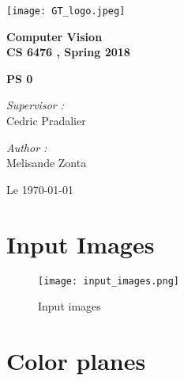 \documentclass[a4paper,11pt]{article}
\begin{document}

\begin{titlepage}

\begin{center}
\texttt{[image: GT\_logo.jpeg]}
\end{center}
\hrulefill
\begin{center}\bfseries\huge
   Computer Vision \\
   CS 6476 , Spring 2018\\
   \end{center}
  \begin{center}\bfseries\large
     PS 0\\
    \hrulefill
\end{center}
\vspace*{1cm}
\begin{minipage}[t]{0.6\textwidth}
  \begin{flushleft} \large
    \emph{Supervisor : }\\
    Cedric Pradalier \\
  \end{flushleft}
\end{minipage}
\begin{minipage}[t]{0.3\textwidth}
  \begin{flushright} \large
    \emph{Author :} \\
    Melisande Zonta \\
  \end{flushright}
\end{minipage}
\begin{flushright}
       Le \today 
\end{flushright} 
\end{titlepage}

\tableofcontents
\clearpage

\section{Input Images}

\begin{figure}[H]
\centering
\texttt{[image: input\_images.png]}
 \caption{Input images}
\label{input_images}
\end{figure}

\section{Color planes}
\end{document}
